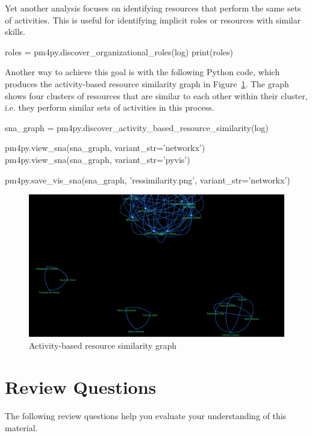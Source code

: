 Yet another analysis focuses on identifying resources that perform the same sets of activities. This is useful for identifying implicit roles or resources with similar skills.

\begin{samepage}
\begin{pythoncode}
roles = pm4py.discover_organizational_roles(log)
print(roles)
\end{pythoncode}
\end{samepage}

Another way to achieve this goal is with the following Python code, which produces the activity-based resource similarity graph in Figure~\ref{fig:resource_similarity}. The graph shows four clusters of resources that are similar to each other within their cluster, i.e. they perform similar sets of activities in this process. 

\begin{samepage}
\begin{pythoncode}
sna_graph = pm4py.discover_activity_based_resource_similarity(log)

pm4py.view_sna(sna_graph, variant_str='networkx')
pm4py.view_sna(sna_graph, variant_str='pyvis')

pm4py.save_vis_sna(sna_graph, 'ressimilarity.png',
    variant_str='networkx')
\end{pythoncode}
\end{samepage}

\begin{figure}
\centering
\includegraphics[width=.66\textwidth]{screen3.png}
\caption{Activity-based resource similarity graph}
\label{fig:resource_similarity}
\end{figure}

\section{Review Questions}

The following review questions help you evaluate your understanding of this material.

